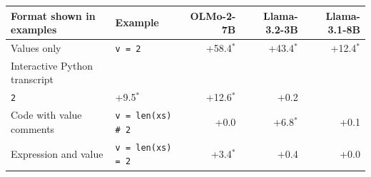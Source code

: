 \begin{tabular}{@{}llrrr@{}}
\toprule
Format shown in examples & Example & OLMo-2-7B & Llama-3.2-3B & Llama-3.1-8B \\
\midrule
Values only & \texttt{v = 2} & +58.4$^{*}$ & +43.4$^{*}$ & +12.4$^{*}$ \\
Interactive Python transcript & \shortstack[l]{\texttt{>{}>{}> v}\\\texttt{2}} & +9.5$^{*}$ & +12.6$^{*}$ & +0.2 \\
Code with value comments & \texttt{v = len(xs) \# 2} & +0.0 & +6.8$^{*}$ & +0.1 \\
Expression and value & \texttt{v = len(xs) = 2} & +3.4$^{*}$ & +0.4 & +0.0 \\
\bottomrule
\end{tabular}
